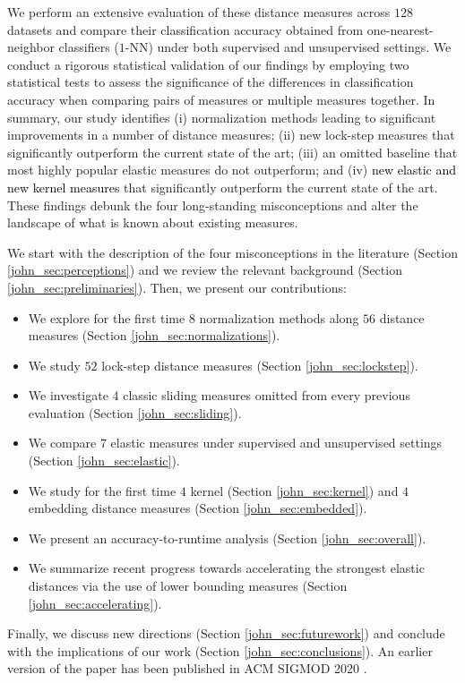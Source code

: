 \documentclass[11pt]{article}
\begin{document}
We perform an extensive evaluation of these distance measures across $128$ datasets \cite{UCRArchive2018} and compare their classification accuracy obtained from one-nearest-neighbor classifiers ($1$-NN) under both supervised and unsupervised settings. We conduct a rigorous statistical validation of our findings by employing two statistical tests to assess the significance of the differences in classification accuracy when comparing pairs of measures or multiple measures together. In summary, our study identifies (i) normalization methods leading to significant improvements in a number of distance measures; (ii) new lock-step measures that significantly outperform the current state of the art; (iii) an omitted baseline that most highly popular elastic measures do not outperform; and (iv) \textcolor{black}{new elastic and new kernel measures} that significantly outperform the current state of the art. These findings debunk the four long-standing misconceptions and alter the landscape of what is known about existing measures. 




We start with the description of the four misconceptions in the literature (Section \ref{john_sec:perceptions}) and we review the relevant background (Section \ref{john_sec:preliminaries}). Then, we present our contributions: 
\begin{itemize}[noitemsep,topsep=0pt,parsep=0pt,partopsep=0pt,leftmargin=0.5cm]
	\item We explore for the first time $8$ normalization methods along $56$ distance measures (Section
	\ref{john_sec:normalizations}).
	\item We study $52$ lock-step distance measures (Section
	\ref{john_sec:lockstep}).
	\item We investigate $4$ classic sliding measures omitted from every previous evaluation (Section \ref{john_sec:sliding}).
	\item We compare $7$ elastic measures under supervised and unsupervised settings (Section \ref{john_sec:elastic}).
	\item We study for the first time $4$ kernel (Section \ref{john_sec:kernel}) and $4$ embedding distance measures (Section \ref{john_sec:embedded}).
	\item We present an accuracy-to-runtime analysis (Section \ref{john_sec:overall}).
 	\item We summarize recent progress towards accelerating the strongest elastic distances via the use of lower bounding measures (Section \ref{john_sec:accelerating}).
\end{itemize}
\noindent Finally, we discuss new directions (Section \ref{john_sec:futurework}) and conclude with the implications of our work (Section \ref{john_sec:conclusions}). An earlier version of the paper has been published in ACM SIGMOD 2020 \cite{paparrizos2020debunking}.
\end{document}
